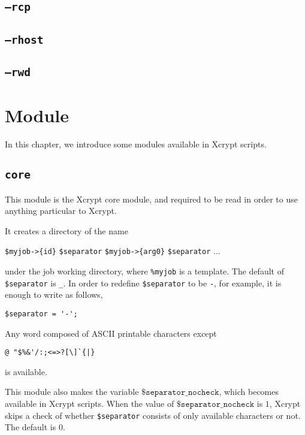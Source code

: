 \documentclass[a4paper,10pt]{report}
\begin{document}
\section{\texttt{--rcp}}
\section{\texttt{--rhost}}
\section{\texttt{--rwd}}

\chapter{Module}\label{chapmodule}

In this chapter, we introduce some modules available in Xcrypt scripts.

\section{\texttt{core}}

This module is the Xcrypt core module, and required to be read in
order to use anything particular to Xcrypt.

It creates a directory of the name
\begin{center}
 \texttt{\$myjob->\{id\}} \texttt{\$separator}
 \texttt{\$myjob->\{arg0\}} \texttt{\$separator} ...
\end{center}
under the job working directory, where \texttt{\%myjob} is a template.
The default of \texttt{\$separator} is \texttt{\_}.  In order to
redefine \texttt{\$separator} to be \texttt{-}, for example, it is
enough to write as follows,
\begin{boxnote}
\begin{verbatim}
$separator = '-';
\end{verbatim}
\end{boxnote}
\vspace{\baselineskip}

Any word composed of ASCII printable characters except
\begin{center}
\verb*+@ "$%&'/:;<=>?[\]`{|}+        %
\end{center}
is available.

This module also makes the variable $\texttt{\$separator\_nocheck}$,
which becomes available in Xcrypt scripts.  When the value of
$\texttt{\$separator\_nocheck}$ is $1$, Xcrypt skips a check of
whether \texttt{\$separator} consists of only available characters or not.
The default is $0$.
\end{document}
